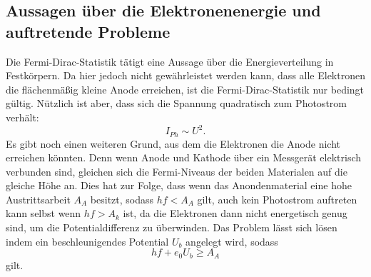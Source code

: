 \subsection{Aussagen über die Elektronenenergie und auftretende Probleme}
Die Fermi-Dirac-Statistik tätigt eine Aussage über die Energieverteilung in Festkörpern. Da hier jedoch nicht gewährleistet werden kann, dass alle Elektronen die
flächenmäßig kleine Anode erreichen, ist die Fermi-Dirac-Statistik nur bedingt gültig. Nützlich ist aber, dass sich die Spannung quadratisch zum Photostrom verhält:
\begin{equation*}
    I_{Ph} \sim U^2.
\end{equation*}
Es gibt noch einen weiteren Grund, aus dem die Elektronen die Anode nicht erreichen könnten. Denn wenn Anode und Kathode über ein Messgerät elektrisch verbunden sind, 
gleichen sich die Fermi-Niveaus der beiden Materialen auf die gleiche Höhe an. Dies hat zur Folge, dass wenn das Anondenmaterial eine hohe Austrittsarbeit $A_A$
besitzt, sodass $hf < A_A$ gilt, auch kein Photostrom auftreten kann selbst wenn $hf > A_k$ ist, da die Elektronen dann nicht energetisch genug sind, um die Potentialdifferenz
zu überwinden. Das Problem lässt sich lösen indem ein beschleunigendes Potential $U_b$ angelegt wird, sodass
\begin{equation*}
    hf + e_0 U_b \geq A_A
\end{equation*}
gilt.